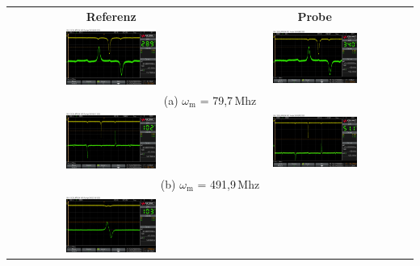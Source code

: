 \begin{center}
    \captionsetup{type=figure}
    \begin{tabular}{c c}
        \textbf{Referenz} & \textbf{Probe} \\[0,5cm]
        \includegraphics[width=0.45\textwidth]{Bilder/Jodlinie/scope_6.png} 
        & \includegraphics[width=0.45\textwidth]{Bilder/Jodlinie/scope_7.png} \\ 
        \multicolumn{2}{c}{(a) $\omega_\mathrm{m} $ = 79,7\,Mhz} \\[0,3cm]
        \includegraphics[width=0.45\textwidth]{Bilder/Jodlinie/scope_4.png}
        & \includegraphics[width=0.45\textwidth]{Bilder/Jodlinie/scope_5.png} \\
        \multicolumn{2}{c}{(b) $\omega_\mathrm{m} $ = 491,9\,Mhz} \\[0,3cm]
        \includegraphics[width=0.45\textwidth]{Bilder/Jodlinie/scope_8.png}

\end{tabular}
\end{center}
